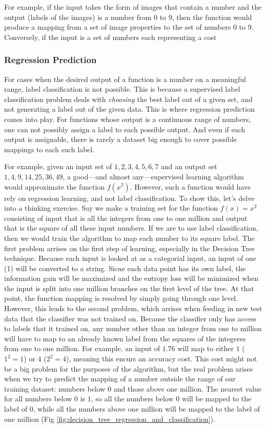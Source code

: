 For example, if the input takes the form of images that contain a number and the output (labels of the images) is a number from 0 to 9, then the function would produce a mapping from a set of image properties to the set of numbers 0 to 9. Conversely, if the input is a set of numbers each representing a cost

\subsubsection{Regression Prediction}
\label{sec:regression_supervised_learning}
For cases when the desired output of a function is a number on a meaningful range, label classification is not possible. This is because a supervised label classification problem deals with \textit{choosing} the best label out of a given set, and not generating a label out of the given data. This is where regression prediction comes into play. For functions whose output is a continuous range of numbers, one can not possibly assign a label to each possible output. And even if each output is assignable, there is rarely a dataset big enough to cover possible mappings to each such label.

For example, given an input set of ${1,2,3,4,5,6,7}$ and an output set ${1,4,9,14,25,36,49}$, a good---and almost any---supervised learning algorithm would approximate the function $f(x^2)$. However, such a function would have rely on regression learning, and not label classification. To show this, let's delve into a thinking exercise. Say we make a training set for the function $f(x) = x^2$ consisting of input that is all the integers from one to one million and output that is the square of all these input numbers. If we are to use label classification, then we would train the algorithm to map each number to its square label. The first problem arrises on the first step of learning, especially in the Decision Tree technique. Because each input is looked at as a categorial input, an input of one (1) will be converted to a string. Sicne each data point has its own label, the information gain will be maximized and the entropy loss will be minimized when the input is split into one million branches on the first level of the tree. At that point, the function mapping is resolved by simply going through one level. However, this leads to the second problem, which arrises when feeding in new test data that the classifier was not trained on. Because the classifier only has access to labels that it trained on, any number other than an integer from one to million will have to map to an already known label from the squares of the integeres from one to one million. For example, an input of $1.76$ will map to either $1$ ($1^2=1$) or $4$ ($2^2 = 4$), meaning this encurs an accuracy cost. This cost might not be a big problem for the purposes of the algorithm, but the real problem arises when we try to predict the mapping of a number outside the range of our training dataset: numbers below 0 and those above one million. The nearest value for all numbers below 0 is 
$1$, so all the numbers below 0 will be mapped to the label of $0$, while all the numbers above one million will be mapped to the label of one million (Fig \ref{fig:decision_tree_regression_and_classification}).

